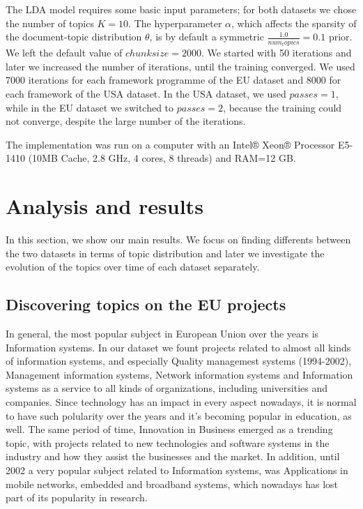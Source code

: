 \documentclass[12pt]{report}
\begin{document}
The LDA model requires some basic input parameters; for both datasets we chose
the number of topics $K=10$. The hyperparameter $\alpha$, which affects the
sparsity of the document-topic distribution $\theta$, is by default a symmetric
$\frac{1.0}{num_topics} = 0.1$ prior. We left the default value of $chunksize=2000$. We
started with 50 iterations and later we increased the number of iterations,
until the training converged. We used 7000 iterations for each framework
programme of the EU dataset and 8000 for each framework of the USA dataset. In
the USA dataset, we used $passes=1$, while in the EU dataset we switched to
$passes=2$, because the training could not converge, despite the large number of
the iterations.

The implementation was run on a computer with an Intel® Xeon® Processor E5-1410
(10MB Cache, 2.8 GHz, 4 cores, 8 threads) and RAM=12 GB.


\section{Analysis and results}

In this section, we show our main results. We focus on finding differents
between the two datasets in terms of topic distribution and later we 
investigate the evolution of the topics over time of each dataset separately.


\subsection{Discovering topics on the EU projects}

In general, the most popular subject in European Union over the years is
Information systems. In our dataset we fount projects related to almost all
kinds of information systems, and especially Quality managemest systems
(1994-2002), Management information systems, Network information systems and
Information systems as a service to all kinds of organizations, including
universities and companies. Since technology has an impact in every aspect
nowadays, it is normal to have such polularity over the years and it's becoming
popular in education, as well. The same period of time, Innovation in Business
emerged as a trending topic, with projects related to new technologies and
software systems in the industry and how they assist the businesses and the
market. In addition, until 2002 a very popular subject related to Information
systems, was Applications in mobile networks, embedded and broadband systems,
which nowadays has lost part of its popularity in research.
\end{document}
